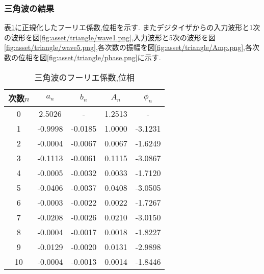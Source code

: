 \subsubsection{三角波の結果}
表\ref{tab:triangle_res}に正規化したフーリエ係数,位相を示す.
またデジタイザからの入力波形と1次の波形を図\ref{fig:asset/triangle/wave1.png},入力波形と5次の波形を図\ref{fig:asset/triangle/wave5.png},各次数の振幅を図\ref{fig:asset/triangle/Amp.png},各次数の位相を図\ref{fig:asset/triangle/phase.png}に示す.
\begin{table}[h]
   \caption{三角波のフーリエ係数,位相}
   \label{tab:triangle_res}
   \centering
   \begin{tabular}{ccccc}
     \hline
     次数$n$&$a_n$&$b_n$&$A_n$&$\phi_n$\\
     \hline \hline
     0 & 2.5026 & - & 1.2513 & - \\
     1 & -0.9998 & -0.0185 & 1.0000 & -3.1231 \\
     2 & -0.0004 & -0.0067 & 0.0067 & -1.6249 \\
     3 & -0.1113 & -0.0061 & 0.1115 & -3.0867 \\
     4 & -0.0005 & -0.0032 & 0.0033 & -1.7120 \\
     5 & -0.0406 & -0.0037 & 0.0408 & -3.0505 \\
     6 & -0.0003 & -0.0022 & 0.0022 & -1.7267 \\
     7 & -0.0208 & -0.0026 & 0.0210 & -3.0150 \\
     8 & -0.0004 & -0.0017 & 0.0018 & -1.8227 \\
     9 & -0.0129 & -0.0020 & 0.0131 & -2.9898 \\
     10 & -0.0004 & -0.0013 & 0.0014 & -1.8446 \\
     \hline
   \end{tabular}
\end{table}
\begin{figure}[htbp]
  \begin{minipage}{0.5\hsize}
  \end{minipage}
  \begin{minipage}{0.5\hsize}
  \end{minipage} 
\end{figure}
\begin{figure}[htbp]
  \begin{minipage}{0.5\hsize}
  \end{minipage}
  \begin{minipage}{0.5\hsize}
  \end{minipage} 
\end{figure}

